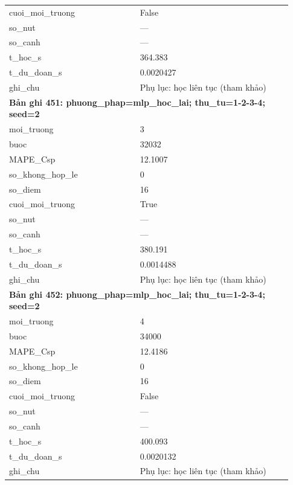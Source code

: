 \begin{longtable}{p{0.43\linewidth}p{0.50\linewidth}}
cuoi\_\allowbreak moi\_\allowbreak truong & False \\
so\_\allowbreak nut & — \\
so\_\allowbreak canh & — \\
t\_\allowbreak hoc\_\allowbreak s & 364.383 \\
t\_\allowbreak du\_\allowbreak doan\_\allowbreak s & 0.0020427 \\
ghi\_\allowbreak chu & Phụ lục: học liên tục (tham khảo) \\
\midrule
\multicolumn{2}{p{0.95\linewidth}}{\textbf{Bản ghi 451: phuong\_phap=mlp\_hoc\_lai; thu\_tu=1-2-3-4; seed=2}} \\
moi\_\allowbreak truong & 3 \\
buoc & 32032 \\
MAPE\_\allowbreak Csp & 12.1007 \\
so\_\allowbreak khong\_\allowbreak hop\_\allowbreak le & 0 \\
so\_\allowbreak diem & 16 \\
cuoi\_\allowbreak moi\_\allowbreak truong & True \\
so\_\allowbreak nut & — \\
so\_\allowbreak canh & — \\
t\_\allowbreak hoc\_\allowbreak s & 380.191 \\
t\_\allowbreak du\_\allowbreak doan\_\allowbreak s & 0.0014488 \\
ghi\_\allowbreak chu & Phụ lục: học liên tục (tham khảo) \\
\midrule
\multicolumn{2}{p{0.95\linewidth}}{\textbf{Bản ghi 452: phuong\_phap=mlp\_hoc\_lai; thu\_tu=1-2-3-4; seed=2}} \\
moi\_\allowbreak truong & 4 \\
buoc & 34000 \\
MAPE\_\allowbreak Csp & 12.4186 \\
so\_\allowbreak khong\_\allowbreak hop\_\allowbreak le & 0 \\
so\_\allowbreak diem & 16 \\
cuoi\_\allowbreak moi\_\allowbreak truong & False \\
so\_\allowbreak nut & — \\
so\_\allowbreak canh & — \\
t\_\allowbreak hoc\_\allowbreak s & 400.093 \\
t\_\allowbreak du\_\allowbreak doan\_\allowbreak s & 0.0020132 \\
ghi\_\allowbreak chu & Phụ lục: học liên tục (tham khảo) \\

\end{longtable}
